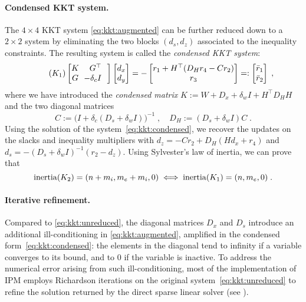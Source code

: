\paragraph{Condensed KKT system.}
The $4 \times 4$ KKT system \eqref{eq:kkt:augmented} can be further
reduced down to a $2 \times 2$ system by eliminating the two blocks
$(d_s, d_z)$ associated to the inequality constraints.
The resulting system is called the \emph{condensed KKT system}:
\begin{equation}
  \label{eq:kkt:condensed}
  \tag{$K_1$}
  \setlength\arraycolsep{3pt}
  \begin{bmatrix}
    K & G^\top \\
    G & -\delta_c I \phantom{^\top}
  \end{bmatrix}
  \begin{bmatrix}
    d_x \\ d_y
  \end{bmatrix}
  =
  -
  \begin{bmatrix}
    r_1 + H^\top(D_H r_4 - C r_2) \\ r_3
  \end{bmatrix}
  =:
  \begin{bmatrix}
    \bar{r}_1 \\ \bar{r}_2
  \end{bmatrix}
   \; ,
\end{equation}
where we have introduced the \emph{condensed matrix} $K := W + D_x + \delta_w I  + H^\top D_H H$
and the two diagonal matrices
\begin{equation}
  C := \big(I + \delta_c(D_s + \delta_w I)\big)^{-1} \; , \quad
  D_H := (D_s + \delta_w I) C \; .
\end{equation}
Using the solution of the system~\eqref{eq:kkt:condensed},
we recover the updates on the slacks and inequality multipliers with
$d_z = -C r_2 + D_H(H d_x + r_4)$ and $d_s = -(D_s + \delta_w I)^{-1}(r_2 - d_z)$.
Using Sylvester's law of inertia, we can prove that
\begin{equation}
  \label{eq:ipm:inertia}
  \operatorname{inertia}(K_2) = (n+m_i, m_e+m_i, 0) \iff
  \operatorname{inertia}(K_1) = (n, m_e, 0) \;.
\end{equation}

\paragraph{Iterative refinement.}
Compared to \eqref{eq:kkt:unreduced},
the diagonal matrices $D_x$ and $D_s$ introduce
an additional ill-conditioning in \eqref{eq:kkt:augmented}, amplified
in the condensed form~\eqref{eq:kkt:condensed}:
the elements in the diagonal tend to infinity if a variable converges to its bound,
and to $0$ if the variable is inactive.
To address the numerical error arising from such ill-conditioning, most of the
implementation of IPM employs Richardson iterations on the original system~\eqref{eq:kkt:unreduced} to refine the solution returned by the direct sparse linear solver (see \cite[Section 3.10]{wachter2006implementation}).

